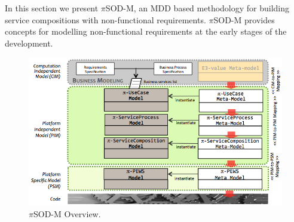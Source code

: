 
In this section we present $\pi$SOD-M, an MDD based methodology for building service compositions with non-functional requirements. $\pi$SOD-M provides concepts for  modelling  non-functional requirements at the early stages of the development.

\begin{figure}[h]
\centering
\includegraphics[width=1.0\textwidth]{figs/piSODM}
\caption{$\pi$SOD-M Overview.}
\label{fig:piSOD-M}
\end{figure}

